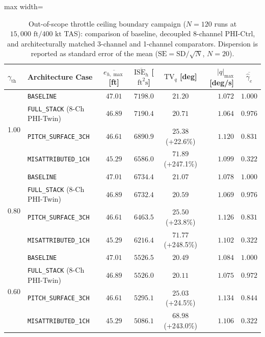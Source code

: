 \documentclass[review,12pt]{elsarticle}
\begin{document}
\begin{table}[!htbp]
\centering
\caption{Out-of-scope throttle ceiling boundary campaign ($N = 120$ runs at $15{,}000\text{ ft} / 400\text{ kt}$ TAS): comparison of baseline, decoupled 8-channel PHI-Ctrl, and architecturally matched 3-channel and 1-channel comparators. Dispersion is reported as standard error of the mean ($\text{SE} = \text{SD}/\sqrt{N}$, $N=20$).}
\label{tab:throttle_boundary}
\scriptsize
\setlength{\tabcolsep}{3pt}
\begin{adjustbox}{max width=\textwidth}
\begin{tabular}{llcccrc}
\toprule
$\gamma_{\text{th}}$ & Architecture Case & $\overline{e_{h,\max}}$ [ft] & $\overline{\text{ISE}_h}$ [$\text{ft}^2\text{s}$] & $\text{TV}_q$ [deg] & $|q|_{\max}$ [deg/s] & $\overline{\hat{\gamma}_e}$ \\
\midrule
\multirow{4}{*}{1.00} & \texttt{BASELINE} & $47.01$ & $7198.0$ & $21.20$ & $1.072$ & $1.000$ \\
 & \texttt{FULL\_STACK} (8-Ch PHI-Twin) & $\bm{46.89}$ & $\bm{7190.4}$ & $\bm{20.71}$ & $\bm{1.064}$ & $\bm{0.976}$ \\
 & \texttt{PITCH\_SURFACE\_3CH} & $46.61$ & $6890.9$ & $25.38$ (+22.6\%) & $1.120$ & $0.831$ \\
 & \texttt{MISATTRIBUTED\_1CH} & $45.29$ & $6586.0$ & $71.89$ (+247.1\%) & $1.099$ & $0.322$ \\
\midrule
\multirow{4}{*}{0.80} & \texttt{BASELINE} & $47.01$ & $6734.4$ & $21.07$ & $1.078$ & $1.000$ \\
 & \texttt{FULL\_STACK} (8-Ch PHI-Twin) & $\bm{46.89}$ & $\bm{6732.4}$ & $\bm{20.59}$ & $\bm{1.069}$ & $\bm{0.976}$ \\
 & \texttt{PITCH\_SURFACE\_3CH} & $46.61$ & $6463.5$ & $25.50$ (+23.8\%) & $1.126$ & $0.831$ \\
 & \texttt{MISATTRIBUTED\_1CH} & $45.29$ & $6216.4$ & $71.77$ (+248.5\%) & $1.102$ & $0.322$ \\
\midrule
\multirow{4}{*}{0.60} & \texttt{BASELINE} & $47.01$ & $5526.5$ & $20.49$ & $1.084$ & $1.000$ \\
 & \texttt{FULL\_STACK} (8-Ch PHI-Twin) & $\bm{46.89}$ & $\bm{5526.0}$ & $\bm{20.11}$ & $\bm{1.075}$ & $\bm{0.972}$ \\
 & \texttt{PITCH\_SURFACE\_3CH} & $46.61$ & $5295.1$ & $25.03$ (+24.5\%) & $1.134$ & $0.844$ \\
 & \texttt{MISATTRIBUTED\_1CH} & $45.29$ & $5086.1$ & $68.98$ (+243.0\%) & $1.106$ & $0.322$ \\

\end{tabular}
\end{adjustbox}
\end{table}
\end{document}
